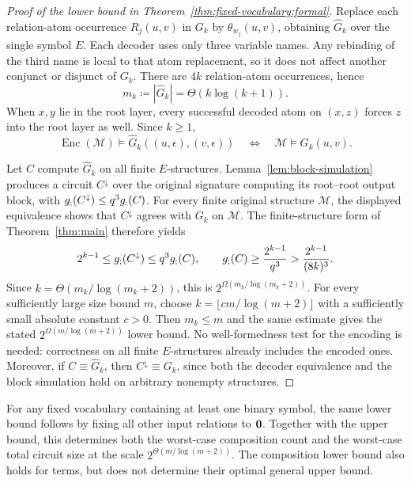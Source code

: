 \begin{proof}[Proof of the lower bound in Theorem~\ref{thm:fixed-vocabulary:formal}]
Replace each relation-atom occurrence $R_j(u,v)$ in $G_k$ by
$\theta_{w_j}(u,v)$, obtaining $\widehat G_k$ over the single symbol $E$.
Each decoder uses only three variable names. Any rebinding of the
third name is local to that atom replacement, so it does not affect
another conjunct or disjunct of $G_k$.
There are $4k$ relation-atom occurrences, hence
\[
 m_k\coloneqq|\widehat G_k|=\Theta(k\log(k+1)).
\]
When $x,y$ lie in the root layer, every successful decoded atom on
$(x,z)$ forces $z$ into the root layer as well. Since $k\ge1$,
\[
 \operatorname{Enc}(\mathcal M)\models
 \widehat G_k((u,\epsilon),(v,\epsilon))
 \quad\Longleftrightarrow\quad
 \mathcal M\models G_k(u,v).
\]

Let $C$ compute $\widehat G_k$ on all finite $E$-structures.
Lemma~\ref{lem:block-simulation} produces a circuit $C^\downarrow$
over the original signature computing its root--root output block,
with $g_{;}(C^\downarrow)\le q^3g_{;}(C)$.
For every finite original structure $\mathcal M$, the displayed
equivalence shows that $C^\downarrow$ agrees with $G_k$ on
$\mathcal M$. The finite-structure form of Theorem~\ref{thm:main}
therefore yields
\[
 2^{k-1}\le g_{;}(C^\downarrow)\le q^3g_{;}(C),
 \qquad
 g_{;}(C)\ge\frac{2^{k-1}}{q^3}
       >\frac{2^{k-1}}{(8k)^3}.
\]
Since $k=\Theta(m_k/\log(m_k+2))$, this is
$2^{\Omega(m_k/\log(m_k+2))}$.
For every sufficiently large size bound $m$, choose
$k=\lfloor c m/\log(m+2)\rfloor$ with a sufficiently small absolute
constant $c>0$. Then $m_k\le m$ and the same estimate gives the
stated $2^{\Omega(m/\log(m+2))}$ lower bound.
No well-formedness test for the encoding is needed: correctness on
all finite $E$-structures already includes the encoded ones. Moreover,
if $C\equiv\widehat G_k$, then $C^\downarrow\equiv G_k$, since both
the decoder equivalence and the block simulation hold on arbitrary
nonempty structures.
\end{proof}

For any fixed vocabulary containing at least one binary symbol, the
same lower bound follows by fixing all other input relations to
$\mathbf{0}$. Together with the upper bound, this determines both the
worst-case composition count and the worst-case total circuit size
at the scale $2^{\Theta(m/\log(m+2))}$.
The composition lower bound also holds for terms, but does not
determine their optimal general upper bound.

